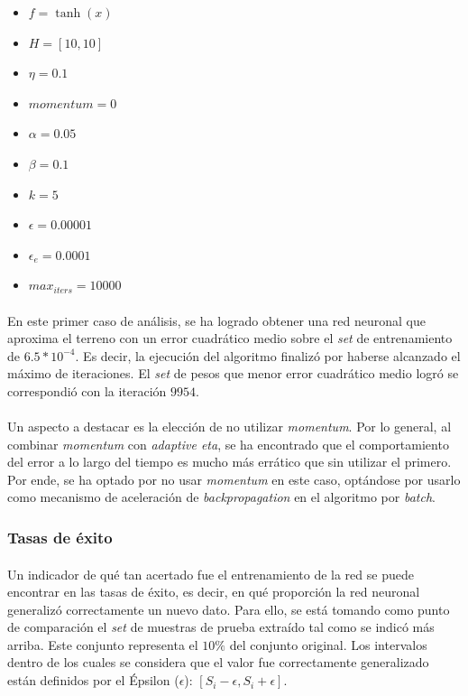 \documentclass[12pt, twocolumn]{article}
\begin{document}
	\begin{itemize}
		\item $f = \tanh(x)$
		\item $H = \left[10, 10\right]$
		\item $\eta = 0.1$
		\item $momentum = 0$
		\item $\alpha = 0.05$
		\item $\beta = 0.1$
		\item $k = 5$
		\item $\epsilon = 0.00001$
		\item $\epsilon_{e} = 0.0001$
		\item $max_{iters} = 10000$
	\end{itemize}
	
	\paragraph{} En este primer caso de análisis, se ha logrado obtener una red neuronal que aproxima el terreno con un error cuadrático medio sobre el \textit{set} de entrenamiento de $6.5*10^{-4}$. Es decir, la ejecución del algoritmo finalizó por haberse alcanzado el máximo de iteraciones. El \textit{set} de pesos que menor error cuadrático medio logró se correspondió con la iteración $9954$.
	
	\paragraph{} Un aspecto a destacar es la elección de no utilizar \textit{momentum}. Por lo general, al combinar \textit{momentum} con \textit{adaptive eta}, se ha encontrado que el comportamiento del error a lo largo del tiempo es mucho más errático que sin utilizar el primero. Por ende, se ha optado por no usar \textit{momentum} en este caso, optándose por usarlo como mecanismo de aceleración de \textit{backpropagation} en el algoritmo por \textit{batch}.
	
	\subsubsection{Tasas de éxito}
	
	\paragraph{} Un indicador de qué tan acertado fue el entrenamiento de la red se puede encontrar en las tasas de éxito, es decir, en qué proporción la red neuronal generalizó correctamente un nuevo dato. Para ello, se está tomando como punto de comparación el \textit{set} de muestras de prueba extraído tal como se indicó más arriba. Este conjunto representa el $10\%$ del conjunto original. Los intervalos dentro de los cuales se considera que el valor fue correctamente generalizado están definidos por el Épsilon ($\epsilon$): $\left[S_{i}-\epsilon, S_{i}+\epsilon\right]$.  
	
\end{document}
